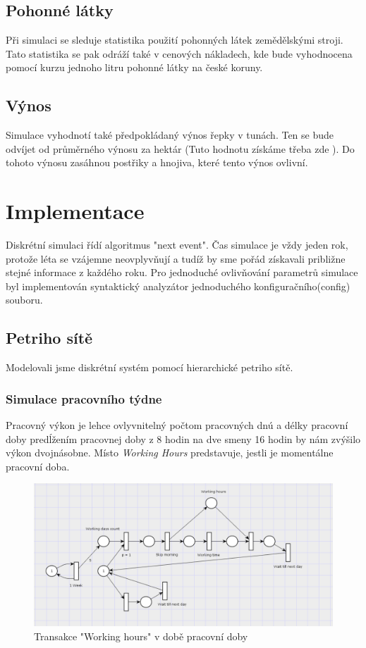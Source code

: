 \documentclass[11pt,a4paper,titlepage]{article}
\begin{document}
\subsection{Pohonné látky}
Při simulaci se sleduje statistika použití pohonných látek zemědělskými stroji. Tato statistika se pak odráží také v cenových nákladech, kde bude vyhodnocena pomocí kurzu jednoho litru pohonné látky na české koruny.

\subsection{Výnos}
Simulace vyhodnotí také předpokládaný výnos řepky v tunách. Ten se bude odvíjet od průměrného výnosu za hektár (Tuto hodnotu získáme třeba zde ). Do tohoto výnosu zasáhnou postřiky a hnojiva, které tento výnos ovlivní.

\pagebreak
\section{Implementace}
Diskrétní simulaci řídí algoritmus "next event". Čas simulace je vždy jeden rok, protože léta se vzájemne neovplyvňují a tudíž by sme pořád získavali približne stejné informace z každého roku.
Pro jednoduché ovlivňování parametrů simulace byl implementován syntaktický analyzátor jednoduchého konfiguračního(config) souboru.

\subsection{Petriho sítě}
Modelovali jsme diskrétní systém pomocí hierarchické petriho sítě.

\subsubsection{Simulace pracovního týdne}
Pracovný výkon je lehce ovlyvnitelný počtom pracovných dnú a délky pracovní doby predĺžením pracovnej doby z 8 hodin na dve smeny 16 hodin by nám zvýšilo výkon dvojnásobne.
Místo \emph{Working Hours} predstavuje, jestli je momentálne pracovní doba.
\begin{figure}[ht!]
\centering
\includegraphics[scale=0.3]{img/WeekGen.png}
\caption{Transakce "Working hours" v době pracovní doby}
\end{figure}
\end{document}
